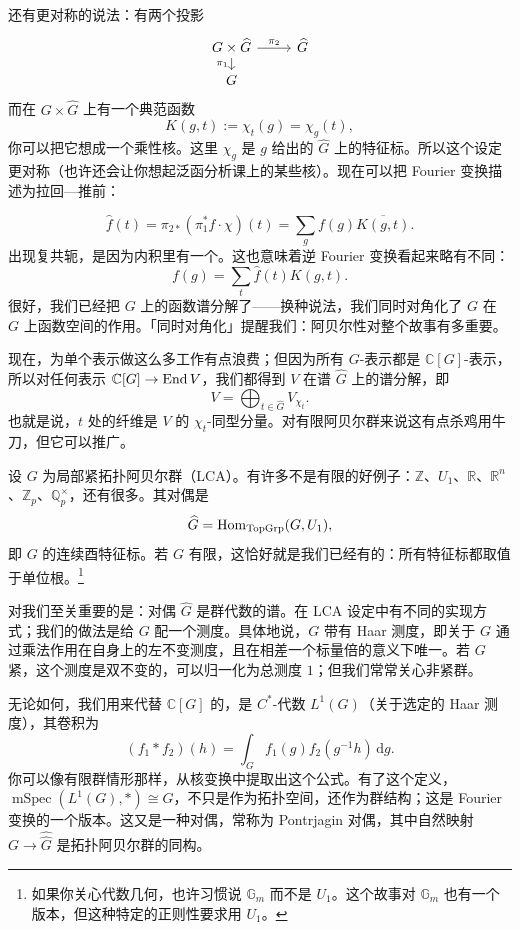 还有更对称的说法：有两个投影
\[
\begin{tikzcd}[row sep=small]
G\times\widehat{G}\arrow[r,"\pi_2"]\arrow[d,"\pi_1"'] & \widehat{G}\\
G &
\end{tikzcd}
\]
而在 $G\times\widehat{G}$ 上有一个典范函数
\[
K(g,t):=\chi_t(g)=\chi_g(t),
\]
你可以把它想成一个乘性核。这里 $\chi_g$ 是 $g$ 给出的 $\widehat{G}$ 上的特征标。所以这个设定更对称（也许还会让你想起泛函分析课上的某些核）。现在可以把 Fourier 变换描述为拉回—推前：


\[
\widehat{f}(t)=\pi_{2*}(\pi_1^*f\cdot\chi)(t)=\sum_{g}f(g)\overline{K(g,t)}.
\]
出现复共轭，是因为内积里有一个。这也意味着逆 Fourier 变换看起来略有不同：
\[
f(g)=\sum_{t}\widehat{f}(t)K(g,t).
\]
很好，我们已经把 $G$ 上的函数谱分解了——换种说法，我们同时对角化了 $G$ 在 $G$ 上函数空间的作用。「同时对角化」提醒我们：阿贝尔性对整个故事有多重要。

现在，为单个表示做这么多工作有点浪费；但因为所有 $G$-表示都是 $\mathbb{C}[G]$-表示，所以对任何表示 $\mathbb{C}[G]\to\operatorname{End} V$，我们都得到 $V$ 在谱 $\widehat{G}$ 上的谱分解，即
\[
V=\bigoplus_{t\in\widehat{G}}V_{\chi_t}.
\]
也就是说，$t$ 处的纤维是 $V$ 的 $\chi_t$-同型分量。对有限阿贝尔群来说这有点杀鸡用牛刀，但它可以推广。

设 $G$ 为局部紧拓扑阿贝尔群（LCA）。有许多不是有限的好例子：$\mathbb{Z}$、$U_1$、$\mathbb{R}$、$\mathbb{R}^n$、$\mathbb{Z}_p$、$\mathbb{Q}_p^\times$，还有很多。其对偶是
\[
\widehat{G}=\operatorname{Hom}_{\mathrm{TopGrp}}(G,U_1),
\]
即 $G$ 的连续酉特征标。若 $G$ 有限，这恰好就是我们已经有的：所有特征标都取值于单位根。\footnote{如果你关心代数几何，也许习惯说 $\mathbb{G}_m$ 而不是 $U_1$。这个故事对 $\mathbb{G}_m$ 也有一个版本，但这种特定的正则性要求用 $U_1$。}

对我们至关重要的是：对偶 $\widehat{G}$ 是群代数的谱。在 LCA 设定中有不同的实现方式；我们的做法是给 $G$ 配一个测度。具体地说，$G$ 带有 Haar 测度，即关于 $G$ 通过乘法作用在自身上的左不变测度，且在相差一个标量倍的意义下唯一。若 $G$ 紧，这个测度是双不变的，可以归一化为总测度 $1$；但我们常常关心非紧群。

无论如何，我们用来代替 $\mathbb{C}[G]$ 的，是 $C^*$-代数 $L^1(G)$（关于选定的 Haar 测度），其卷积为
\[
(f_1*f_2)(h)=\int_G f_1(g)f_2(g^{-1}h)\,\mathrm{d}g.
\]
你可以像有限群情形那样，从核变换中提取出这个公式。有了这个定义，
$\operatorname{mSpec}(L^1(G),*)\cong\widehat{G}$，不只是作为拓扑空间，还作为群结构；这是 Fourier 变换的一个版本。这又是一种对偶，常称为 Pontrjagin 对偶，其中自然映射 $G\to\widehat{\widehat{G}}$ 是拓扑阿贝尔群的同构。


